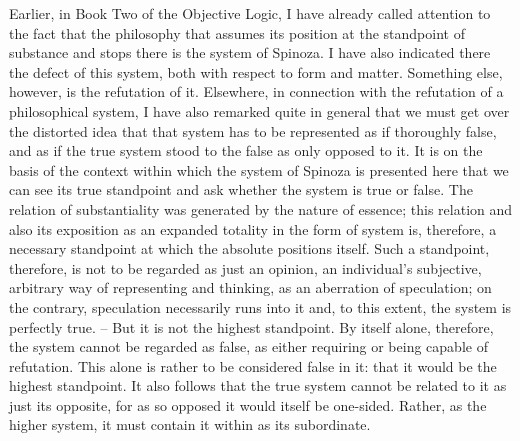Earlier, in Book Two of the Objective Logic,
I have already called attention to the fact that
the philosophy that assumes its position at the standpoint of
substance and stops there is the system of Spinoza.
I have also indicated there the defect of this system,
both with respect to form and matter.
Something else, however, is the refutation of it.
Elsewhere, in connection with the refutation of a philosophical system,
I have also remarked quite in general that we must get over the distorted
idea that that system has to be represented as if thoroughly false, and as
if the true system stood to the false as only opposed to it. It is on the basis
of the context within which the system of Spinoza is presented here that
we can see its true standpoint and ask whether the system is true or false.
The relation of substantiality was generated by the nature of essence; this
relation and also its exposition as an expanded totality in the form of system
is, therefore, a necessary standpoint at which the absolute positions itself.
Such a standpoint, therefore, is not to be regarded as just an opinion, an
individual's subjective, arbitrary way of representing and thinking, as an
aberration of speculation; on the contrary, speculation necessarily runs into
it and, to this extent, the system is perfectly true. – But it is not the highest
standpoint. By itself alone, therefore, the system cannot be regarded as false,
as either requiring or being capable of refutation. This alone is rather to
be considered false in it: that it would be the highest standpoint. It also
follows that the true system cannot be related to it as just its opposite, for
as so opposed it would itself be one-sided. Rather, as the higher system, it
must contain it within as its subordinate.

